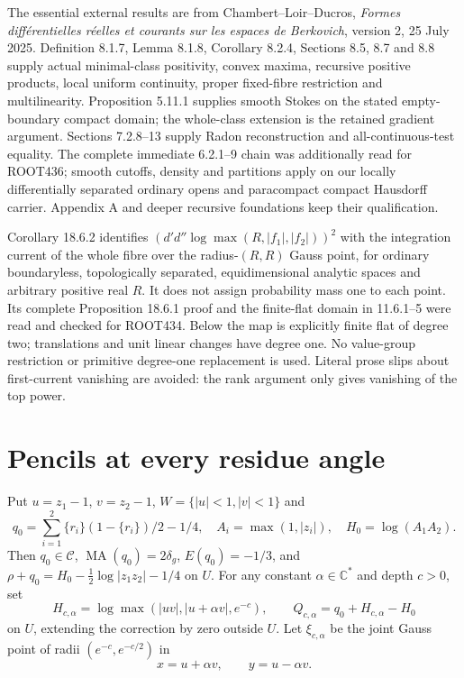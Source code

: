 \documentclass[11pt]{article}
\newcommand{\DD}{d'd''}
\newcommand{\MA}{\operatorname{MA}}
\newcommand{\C}{\mathcal C}
\begin{document}
The essential external results are from Chambert--Loir--Ducros,
\emph{Formes diff\'erentielles r\'eelles et courants sur les espaces de
Berkovich}, version 2, 25 July 2025. Definition 8.1.7, Lemma 8.1.8,
Corollary 8.2.4, Sections 8.5, 8.7 and 8.8 supply actual minimal-class
positivity, convex maxima, recursive positive products, local uniform
continuity, proper fixed-fibre restriction and multilinearity. Proposition
5.11.1 supplies smooth Stokes on the stated empty-boundary compact domain;
the whole-class extension is the retained gradient argument. Sections
7.2.8--13 supply Radon reconstruction and all-continuous-test equality.
The complete immediate 6.2.1--9 chain was additionally read for ROOT436;
smooth cutoffs, density and partitions apply on our locally differentially
separated ordinary opens and paracompact compact Hausdorff carrier.
Appendix A and deeper recursive foundations keep their qualification.

Corollary 18.6.2 identifies
$(\DD\log\max(R,|f_1|,|f_2|))^2$ with the integration current of the
whole fibre over the radius-$(R,R)$ Gauss point, for ordinary boundaryless,
topologically separated, equidimensional analytic spaces and arbitrary
positive real $R$. It does not assign probability mass one to each point.
Its complete Proposition 18.6.1 proof and the finite-flat domain in
11.6.1--5 were read and checked for ROOT434. Below the map is explicitly
finite flat of degree two; translations and unit linear changes have
degree one. No value-group restriction or primitive degree-one replacement
is used. Literal prose slips about first-current vanishing are avoided:
the rank argument only gives vanishing of the top power.

\section{Pencils at every residue angle}
Put $u=z_1-1$, $v=z_2-1$, $W=\{|u|<1,|v|<1\}$ and
\[
 q_0=\sum_{i=1}^2 \{r_i\}(1-\{r_i\})/2-1/4,
 \quad A_i=\max(1,|z_i|),\quad H_0=\log(A_1A_2).
\]
Then $q_0\in\C$, $\MA(q_0)=2\delta_g$, $E(q_0)=-1/3$, and
$\rho+q_0=H_0-\frac12\log|z_1z_2|-1/4$ on $U$.
For any constant $\alpha\in\mathbb C^*$ and depth $c>0$, set
\[
 H_{c,\alpha}=\log\max(|uv|,|u+\alpha v|,e^{-c}),\qquad
 Q_{c,\alpha}=q_0+H_{c,\alpha}-H_0
\]
on $U$, extending the correction by zero outside $U$.
Let $\xi_{c,\alpha}$ be the joint Gauss point of radii
$(e^{-c},e^{-c/2})$ in
\[
 x=u+\alpha v,\qquad y=u-\alpha v.
\]
\end{document}
